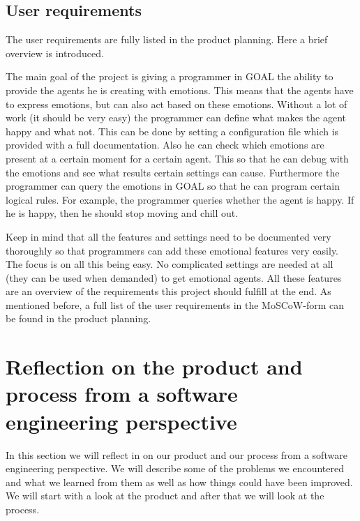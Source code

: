 \documentclass[]{article}
\begin{document}
\subsection{User requirements}
The user requirements are fully listed in the product planning. Here a brief overview is introduced.\par
The main goal of the project is giving a programmer in GOAL the ability to provide the agents he is creating with emotions. This means that the agents have to express emotions, but can also act based on these emotions. Without a lot of work (it should be very easy) the programmer can define what makes the agent happy and what not. This can be done by setting a configuration file which is provided with a full documentation. Also he can check which emotions are present at a certain moment for a certain agent. This so that he can debug with the emotions and see what results certain settings can cause. Furthermore the programmer can query the emotions in GOAL so that he can program certain logical rules. For example, the programmer queries whether the agent is happy. If he is happy, then he should stop moving and chill out.\par Keep in mind that all the features and settings need to be documented very thoroughly so that programmers can add these emotional features very easily. The focus is on all this being easy. No complicated settings are needed at all (they can be used when demanded) to get emotional agents. All these features are an overview of the requirements this project should fulfill at the end. As mentioned before, a full list of the user requirements in the MoSCoW-form can be found in the product planning.


\section{Reflection on the product and process from a software engineering perspective}
In this section we will reflect in on our product and our process from a software engineering perspective. We will describe some of the problems we encountered and what we learned from them as well as how things could have been improved. We will start with a look at the product and after that we will look at the process.
\end{document}
